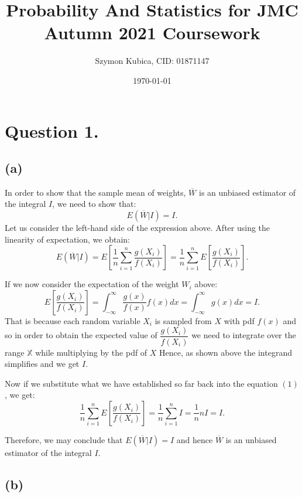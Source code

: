 \documentclass[12pt]{article}
\begin{document}
\title{Probability And Statistics for JMC Autumn 2021 Coursework}
\date{\today}
\author{Szymon Kubica, CID: 01871147}
\maketitle

\pagebreak
\section*{Question 1.}

\subsection*{(a)}

In order to show that the sample mean of weights, $ \overline{W} $ is an unbiased estimator of the integral $ I $,
we need to show that:
\[ E (\overline{W} | I) = I.\]
Let us consider the left-hand side of the expression above. After using the linearity of expectation, we obtain:
\begin{equation} E (\overline{W} | I) = E\left[ \frac{1}{n}\sum_{i = 1}^n \frac{g(X_i)}{f(X_i)}\right] =\frac{1}{n}\sum_{i = 1}^n  E\left[ \frac{g(X_i)}{f(X_i)}\right]  .\end{equation}

If we now consider the expectation of the weight $ W_i $ above:
\[ E\left[ \frac{g(X_i)}{f(X_i)}\right] = \int_{-\infty}^\infty \frac{g(x)}{f(x)} f(x) dx =\int_{-\infty}^\infty g(x)dx = I. \]
That is because each random variable $ X_i $ is sampled from $ X $ with pdf $ f(x) $ 
and so in order to obtain the expected value of $\dfrac{g(X_i)}{f(X_i)}$ 
we need to integrate over the range $ \mathbb{X} $ while multiplying by the pdf of $ X $
Hence, as shown above the integrand simplifies and we get $ I $.

Now if we substitute what we have established so far back into the equation $(1)$, we get:
\begin{equation} \frac{1}{n}\sum_{i = 1}^n  E\left[ \frac{g(X_i)}{f(X_i)}\right] =\frac{1}{n}\sum_{i = 1}^n  I = \frac{1}{n} n I = I    .\end{equation}

Therefore, we may conclude that $ E (\overline{W} | I) = I $ and hence $ \overline{W} $ is an unbiased estimator of
the integral $ I $. 

\subsection*{(b)}
\end{document}
